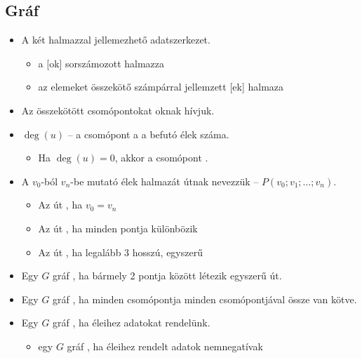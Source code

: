 \documentclass[../../main.tex]{subfiles}
\begin{document}
\subsection{Gráf}

\begin{itemize}
  \item A  két halmazzal jellemezhető adatszerkezet.
        \begin{itemize}
          \item a [ok] sorszámozott halmazza

          \item az elemeket összekötő számpárral jellemzett [ek] halmaza
        \end{itemize}

  \item Az összekötött csomópontokat oknak hívjuk.

  \item $\deg(u)$ -- a csomópont a a befutó élek száma.
        \begin{itemize}
          \item Ha $\deg(u) = 0$, akkor a csomópont .
        \end{itemize}

  \item A $v_0$-ból $v_n$-be mutató élek halmazát
        útnak nevezzük – $P \left( v_0; v_1; \dots ;v_n \right)$.
        \begin{itemize}
          \item Az út , ha $v_0 = v_n$
          \item Az út , ha minden pontja különbözik
          \item Az út , ha legalább 3 hosszú, egyszerű
        \end{itemize}

  \item Egy $G$ gráf ,
        ha bármely 2 pontja között létezik egyszerű út.

  \item Egy $G$ gráf ,
        ha minden csomópontja minden csomópontjával össze van kötve.

  \item Egy $G$ gráf , ha éleihez adatokat rendelünk.
        \begin{itemize}
          \item egy $G$ gráf ,
                ha éleihez rendelt adatok nemnegatívak
        \end{itemize}


\end{itemize}
\end{document}
